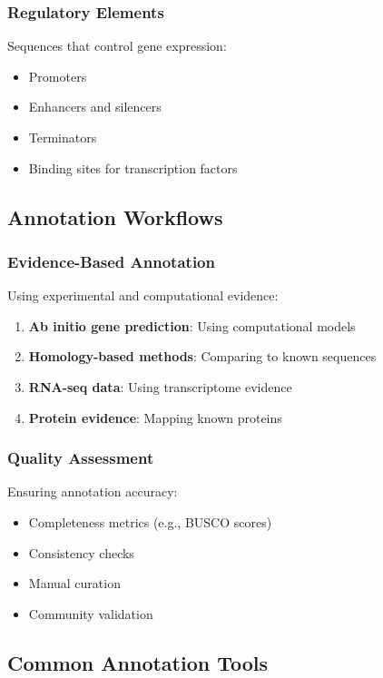 \subsubsection{Regulatory Elements}
Sequences that control gene expression:
\begin{itemize}
    \item Promoters
    \item Enhancers and silencers
    \item Terminators
    \item Binding sites for transcription factors
\end{itemize}

\subsection{Annotation Workflows}

\subsubsection{Evidence-Based Annotation}
Using experimental and computational evidence:

\begin{enumerate}
    \item \textbf{Ab initio gene prediction}: Using computational models
    \item \textbf{Homology-based methods}: Comparing to known sequences
    \item \textbf{RNA-seq data}: Using transcriptome evidence
    \item \textbf{Protein evidence}: Mapping known proteins
\end{enumerate}

\subsubsection{Quality Assessment}
Ensuring annotation accuracy:
\begin{itemize}
    \item Completeness metrics (e.g., BUSCO scores)
    \item Consistency checks
    \item Manual curation
    \item Community validation
\end{itemize}

\subsection{Common Annotation Tools}

